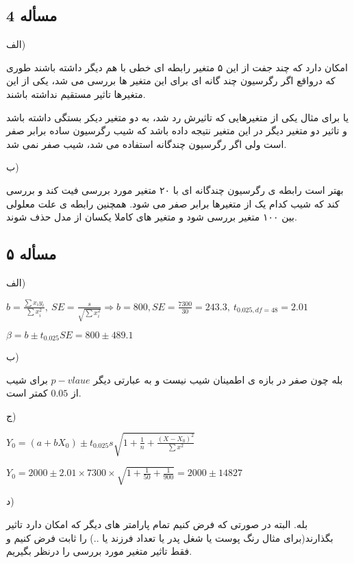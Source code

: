 \documentclass[12pt]{article}
\begin{document}
\subsection*{مسأله 4}
الف)

امکان دارد که چند جفت از این ۵ متغیر رابطه ای خطی با هم دیگر داشته باشند طوری که درواقع اگر رگرسیون چند گانه ای برای این متغیر ها بررسی می شد، یکی از این متغیرها تاثیر مستقیم نداشته باشند.

یا برای مثال یکی از متغیرهایی که تاثیرش رد شد، به دو متغیر دیکر بستگی داشته باشد و تاثیر دو متغیر دیگر در این متغیر نتیجه داده باشد که شیب رگرسیون ساده برابر صفر است ولی اگر رگرسیون چندگانه استفاده می شد، شیب صفر نمی شد.

ب)

بهتر است رابطه ی رگرسیون چندگانه ای با ۲۰ متغیر مورد بررسی فیت کند و بررسی کند که شیب کدام یک از متغیرها برابر صفر می شود. همچنین رابطه ی علت معلولی بین ۱۰۰ متغیر بررسی شود و متغیر های کاملا یکسان از مدل حذف شوند.

\subsection*{مسأله ۵}
الف)
\begin{flushleft}
$b=\frac{\sum x_i y_i}{\sum x_i^2},\ SE=\frac{s}{\sqrt{\sum x_i^2}}\Rightarrow b=800 , SE=\frac{7300}{30}=243.3,\ t_{0.025, df=48}=2.01$

$\beta=b \pm t_{0.025}SE=800 \pm 489.1$
\end{flushleft}
ب)

بله چون صفر در بازه ی اطمینان شیب نیست و به عبارتی دیگر $p-vlaue$ برای شیب از $0.05$  کمتر است.

ج)

\begin{flushleft}
$Y_0=(a+bX_0)\pm t_{0.025}s\sqrt{1+\frac{1}{n}+\frac{(X-X_0)^2}{\sum x^2}}$

$Y_0=2000 \pm 2.01\times 7300 \times \sqrt{1+\frac{1}{50}+\frac{1}{900}}=2000\pm 14827$
\end{flushleft}
د)

بله. البته در صورتی که فرض کنیم تمام پارامتر های دیگر که امکان دارد تاثیر بگذارند(برای مثال رنگ پوست یا شغل پدر یا تعداد فرزند یا ..) را ثابت فرض کنیم و فقط تاثیر متغیر مورد بررسی را درنظر بگیریم.
\end{document}
